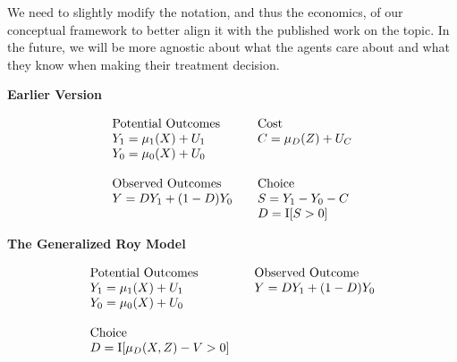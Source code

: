\begin{frame}
We need to slightly modify the notation, and thus the economics, of our conceptual framework to better align it with the published work on the topic. In the future, we will be more agnostic about what the agents care about and what they know when making their treatment decision.
\end{frame}

\begin{frame}
\textbf{Earlier Version}

\begin{align*}\begin{array}{l@{\qquad}l}
\text{Potential Outcomes} & \text{Cost} \\
Y_1 = \mu_1(X) + U_1      &C = \mu_D(Z) + U_C \\
Y_0 = \mu_0(X) + U_0      & \\
    & \\
\text{Observed Outcomes } & \text{Choice} \\
Y = D Y_1 + (1 - D)Y_0 & S = Y_1 - Y_0 - C \\
                       & D = \mathrm{I}[S > 0] \\
\end{array}\end{align*}
\end{frame}


\begin{frame}
\textbf{The Generalized Roy Model}

\begin{align*}\begin{array}{l@{\qquad}l}
\text{Potential Outcomes} &\text{Observed Outcome}\\
Y_1 = \mu_1(X) + U_1      &  Y = D Y_1 + (1 - D)Y_0 \\
Y_0 = \mu_0(X) + U_0      &\\
    & \\
\text{Choice} & \\
D = \mathrm{I}[\mu_D(X, Z) - V > 0] & \\
\end{array}
\end{align*}
\end{frame}
\maketitle

